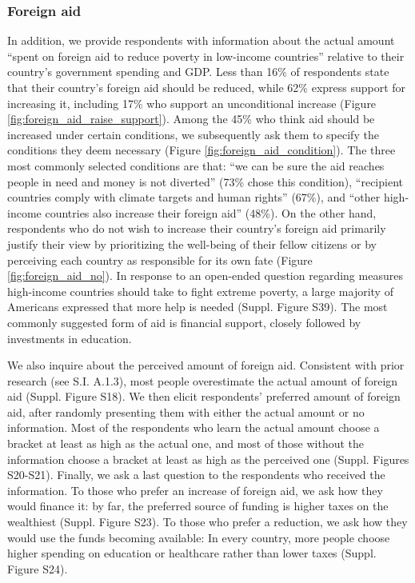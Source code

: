 \documentclass[12pt,english]{article}
\begin{document}
\subsubsection{Foreign aid}\label{subsubsec:support_foreign_aid} %

In addition, we provide respondents with information about the actual amount ``spent on foreign aid to reduce poverty in low-income countries'' relative to their country's government spending and GDP. Less than 16\% of respondents state that their country's foreign aid should be reduced, while 62\% express support for increasing it, including 17\% who support an unconditional increase (Figure \ref{fig:foreign_aid_raise_support}). Among the 45\% who think aid should be increased under certain conditions, we subsequently ask them to specify the conditions they deem necessary (Figure \ref{fig:foreign_aid_condition}). The three most commonly selected conditions are that: ``we can be sure the aid reaches people in need and money is not diverted'' (73\% chose this condition), ``recipient countries comply with climate targets and human rights'' (67\%), and ``other high-income countries also increase their foreign aid'' (48\%). %
On the other hand, respondents who do not wish to increase their country's foreign aid primarily justify their view by prioritizing the well-being of their fellow citizens or by perceiving each country as responsible for its own fate (Figure \ref{fig:foreign_aid_no}). In response to an open-ended question regarding measures high-income countries should take to fight extreme poverty, a large majority of Americans expressed that more help is needed (Suppl. Figure S39). %
The most commonly suggested form of aid is financial support, closely followed by investments in education. 

We also inquire about the perceived amount of foreign aid. Consistent with prior research (see S.I. A.1.3), %
most people overestimate the actual amount of foreign aid (Suppl. Figure S18). %
We then elicit respondents' preferred amount of foreign aid, after randomly presenting them with either the actual amount or no information. Most of the respondents who learn the actual amount choose a bracket at least as high as the actual one, and most of those without the information choose a bracket at least as high as the perceived one (Suppl. Figures S20-S21). %
Finally, we ask a last question to the respondents who received the information. To those who prefer an increase of foreign aid, we ask how they would finance it: by far, the preferred source of funding is higher taxes on the wealthiest (Suppl. Figure S23). %
To those who prefer a reduction, we ask how they would use the funds becoming available: %
In every country, more people choose higher spending on education or healthcare rather than lower taxes (Suppl. Figure S24). %
\end{document}
